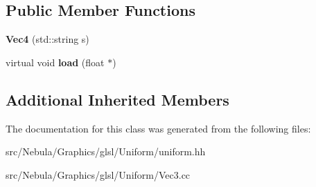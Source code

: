 \subsection*{Public Member Functions}
\begin{DoxyCompactItemize}
\item 
\hypertarget{classNeb_1_1glsl_1_1Uniform_1_1Scalar_1_1Vec4_a1e9c061fa7bf37160ecaa5cbb147ddcb}{{\bfseries Vec4} (std\-::string s)}\label{classNeb_1_1glsl_1_1Uniform_1_1Scalar_1_1Vec4_a1e9c061fa7bf37160ecaa5cbb147ddcb}

\item 
\hypertarget{classNeb_1_1glsl_1_1Uniform_1_1Scalar_1_1Vec4_ac789b262241f8e23c42c79e4ea573cd1}{virtual void {\bfseries load} (float $\ast$)}\label{classNeb_1_1glsl_1_1Uniform_1_1Scalar_1_1Vec4_ac789b262241f8e23c42c79e4ea573cd1}

\end{DoxyCompactItemize}
\subsection*{Additional Inherited Members}


The documentation for this class was generated from the following files\-:\begin{DoxyCompactItemize}
\item 
src/\-Nebula/\-Graphics/glsl/\-Uniform/uniform.\-hh\item 
src/\-Nebula/\-Graphics/glsl/\-Uniform/Vec3.\-cc\end{DoxyCompactItemize}
